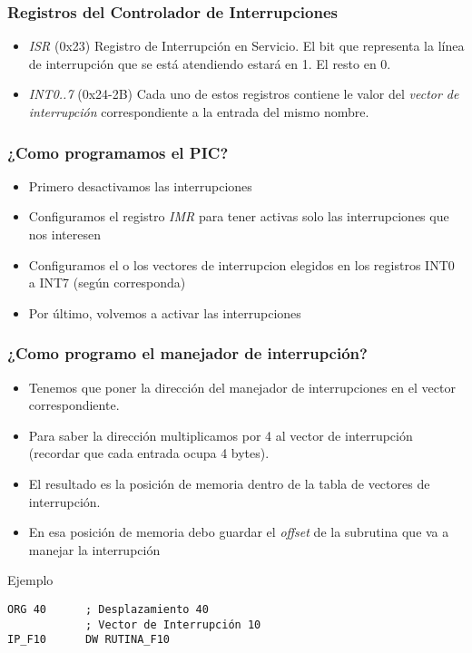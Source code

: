 \documentclass{beamer}
\begin{document}
\begin{frame}
\frametitle{Registros del Controlador de Interrupciones}

\begin{itemize}
 \item \emph{ISR} (0x23) Registro de Interrupción en Servicio. El bit que representa la línea de interrupción que se está atendiendo estará en 1. El resto en 0.
 \item \emph{INT0..7} (0x24-2B) Cada uno de estos registros contiene le valor del \emph{vector de interrupción} correspondiente a la entrada del mismo nombre.
\end{itemize}

\end{frame}

\begin{frame}
\frametitle{¿Como programamos el PIC?}

\begin{itemize}
 \item Primero desactivamos las interrupciones
 \item Configuramos el registro \emph{IMR} para tener activas solo las interrupciones que nos interesen
 \item Configuramos el o los vectores de interrupcion elegidos en los registros INT0 a INT7 (según corresponda)
 \item Por último, volvemos a activar las interrupciones
\end{itemize}

\end{frame}

\begin{frame}[fragile]
\frametitle{¿Como programo el manejador de interrupción?}

\begin{itemize}
 \item Tenemos que poner la dirección del manejador de interrupciones en el vector correspondiente.
 \item Para saber la dirección multiplicamos por 4 al vector de interrupción (recordar que cada entrada ocupa 4 bytes).
 \item El resultado es la posición de memoria dentro de la tabla de vectores de interrupción.
 \item En esa posición de memoria debo guardar el \emph{offset} de la subrutina que va a manejar la interrupción
\end{itemize}
\begin{block}{Ejemplo}
\begin{verbatim}
ORG 40      ; Desplazamiento 40 
            ; Vector de Interrupción 10
IP_F10	    DW RUTINA_F10
\end{verbatim}
\end{block}

\end{frame}
\end{document}
